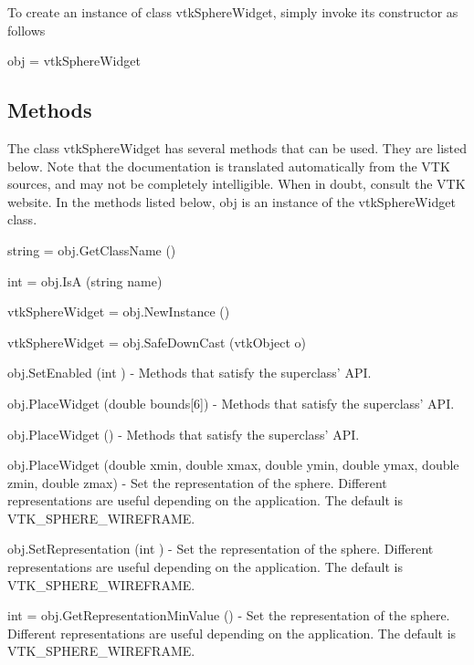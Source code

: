 To create an instance of class vtk\-Sphere\-Widget, simply invoke its constructor as follows \begin{DoxyVerb}  obj = vtkSphereWidget
\end{DoxyVerb}
 \hypertarget{vtkwidgets_vtkxyplotwidget_Methods}{}\subsection{Methods}\label{vtkwidgets_vtkxyplotwidget_Methods}
The class vtk\-Sphere\-Widget has several methods that can be used. They are listed below. Note that the documentation is translated automatically from the V\-T\-K sources, and may not be completely intelligible. When in doubt, consult the V\-T\-K website. In the methods listed below, {\ttfamily obj} is an instance of the vtk\-Sphere\-Widget class. 
\begin{DoxyItemize}
\item {\ttfamily string = obj.\-Get\-Class\-Name ()}  
\item {\ttfamily int = obj.\-Is\-A (string name)}  
\item {\ttfamily vtk\-Sphere\-Widget = obj.\-New\-Instance ()}  
\item {\ttfamily vtk\-Sphere\-Widget = obj.\-Safe\-Down\-Cast (vtk\-Object o)}  
\item {\ttfamily obj.\-Set\-Enabled (int )} -\/ Methods that satisfy the superclass' A\-P\-I.  
\item {\ttfamily obj.\-Place\-Widget (double bounds\mbox{[}6\mbox{]})} -\/ Methods that satisfy the superclass' A\-P\-I.  
\item {\ttfamily obj.\-Place\-Widget ()} -\/ Methods that satisfy the superclass' A\-P\-I.  
\item {\ttfamily obj.\-Place\-Widget (double xmin, double xmax, double ymin, double ymax, double zmin, double zmax)} -\/ Set the representation of the sphere. Different representations are useful depending on the application. The default is V\-T\-K\-\_\-\-S\-P\-H\-E\-R\-E\-\_\-\-W\-I\-R\-E\-F\-R\-A\-M\-E.  
\item {\ttfamily obj.\-Set\-Representation (int )} -\/ Set the representation of the sphere. Different representations are useful depending on the application. The default is V\-T\-K\-\_\-\-S\-P\-H\-E\-R\-E\-\_\-\-W\-I\-R\-E\-F\-R\-A\-M\-E.  
\item {\ttfamily int = obj.\-Get\-Representation\-Min\-Value ()} -\/ Set the representation of the sphere. Different representations are useful depending on the application. The default is V\-T\-K\-\_\-\-S\-P\-H\-E\-R\-E\-\_\-\-W\-I\-R\-E\-F\-R\-A\-M\-E.  

\end{DoxyItemize}
